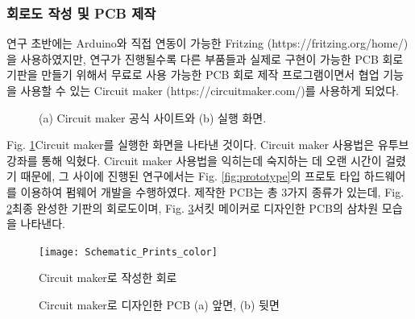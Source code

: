 \subsubsection{회로도 작성 및 PCB 제작}

연구 초반에는 Arduino와 직접 연동이 가능한 Fritzing (https://fritzing.org/home/)을 사용하였지만, 연구가 진행될수록 다른 부품들과 실제로 구현이 가능한 PCB 회로기판을 만들기 위해서 무료로 사용 가능한 PCB 회로 제작 프로그램이면서 협업 기능을 사용할 수 있는 Circuit maker (https://circuitmaker.com/)를 사용하게 되었다. 

\begin{figure}[h]
	\begin{center}
	\end{center}
	\caption{(a) Circuit maker 공식 사이트와 (b) 실행 화면.}
	\label{fig:circuit_maker}
\end{figure}

Fig. \ref{fig:circuit_maker}\는 Circuit maker를 실행한 화면을 나타낸 것이다. Circuit maker 사용법은 유투브 강좌를 통해 익혔다. Circuit maker 사용법을 익히는데 숙지하는 데 오랜 시간이 걸렸기 때문에, 그 사이에 진행된 연구에서는 Fig. \ref{fig:prototype}의 프로토 타입 하드웨어를 이용하여 펌웨어 개발을 수행하였다. 제작한 PCB는 총 3가지 종류가 있는데, Fig. \ref{fig:Schematic_Prints}\는 최종 완성한 기판의 회로도이며, Fig. \ref{fig:pcb}\은 서킷 메이커로 디자인한 PCB의 삼차원 모습을 나타낸다.

\begin{figure}[h]
	\begin{center}
		\texttt{[image: Schematic\_Prints\_color]}
		\caption{Circuit maker로 작성한 회로}
		\label{fig:Schematic_Prints}
	\end{center}
\end{figure}

\begin{figure}[h]
	\begin{center}
	\end{center}
		\caption{Circuit maker로 디자인한 PCB (a) 앞면, (b) 뒷면}
	\label{fig:pcb}
\end{figure}

